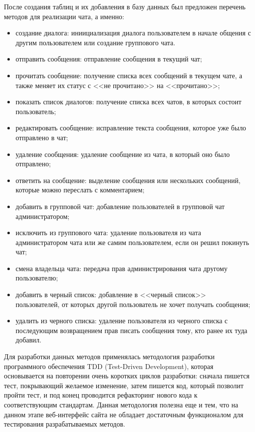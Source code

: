 После создания таблиц и их добавления в базу данных был предложен перечень методов для реализации чата, а именно:
\begin{itemize}
    \item создание диалога: иниициализация диалога пользователем в начале общения с другим пользователем или создание группового чата.
    \item отправить сообщения: отправление сообщения в текущий чат;
    \item прочитать сообщение: получение списка всех сообщений в текущем чате, а также меняет их статус с <<не прочитано>> на <<прочитано>>;
    \item показать список диалогов: получение списка всех чатов, в которых состоит пользователь;
    \item редактировать сообщение: исправление текста сообщения, которое уже было отправлено в чат;
    \item удаление сообщения: удаление сообщение из чата, в который оно было отправлено;
    \item ответить на сообщение: выделение сообщения или нескольких сообщений, которые можно переслать с комментарием;
    \item добавить в групповой чат: добавление пользователей в групповой чат администратором;
    \item исключить из группового чата: удаление пользователя из чата администратором чата или же самим пользователем, если он решил покинуть чат;
    \item смена владельца чата: передача прав администрирования чата другому пользователю;
    \item добавить в черный список: добавление в <<черный список>> пользователей, от которых другой пользователь не хочет получать сообщения;
    \item удалить из черного списка: удаление пользователя из черного списка с последующим возвращением прав писать сообщения тому, кто ранее их туда добавил.
\end{itemize}

\vspace{1em}

Для разработки данных методов применялась методология разработки программного обеспечения TDD (Test-Driven Development), которая основывается 
на повторении очень коротких циклов разработки: сначала пишется тест, покрывающий желаемое изменение, затем пишется код, который позволит пройти тест, 
и под конец проводится рефакторинг нового кода к соответствующим стандартам. Данная методология полезна еще и тем, что на данном этапе веб-интерфейс сайта не обладает достаточным функционалом для
тестирования разрабатываемых методов.

